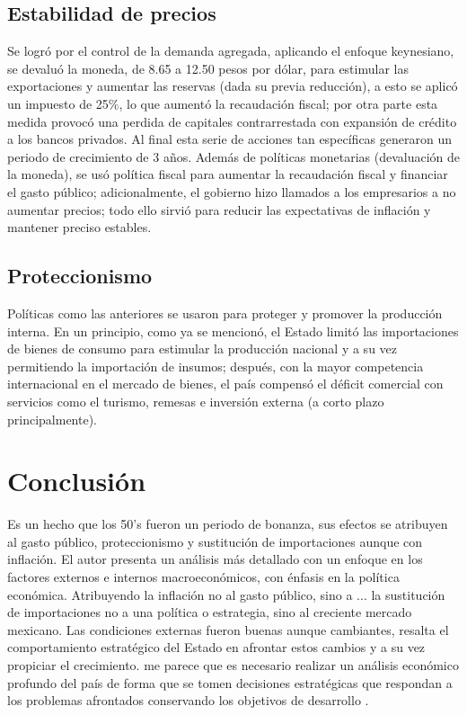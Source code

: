 \subsection{Estabilidad de precios}
Se logró por el control de la demanda agregada, aplicando el enfoque keynesiano, se devaluó la moneda, de 8.65 a 12.50 pesos por dólar, para estimular las exportaciones y aumentar las reservas (dada su previa reducción), a esto se aplicó un impuesto de 25\%, lo que aumentó la recaudación fiscal; por otra parte esta medida provocó una perdida de capitales contrarrestada con expansión de crédito a los bancos privados. Al final esta serie de acciones tan específicas generaron un periodo de crecimiento de 3 años.
Además de políticas monetarias (devaluación de la moneda), se usó política fiscal para aumentar la recaudación fiscal y financiar el gasto público; adicionalmente, el gobierno hizo llamados a los empresarios a no aumentar precios; todo ello sirvió para reducir las expectativas de inflación y mantener preciso estables.
\subsection{Proteccionismo}
Políticas como las anteriores se usaron para proteger y promover la producción interna. En un principio, como ya se mencionó, el Estado limitó las importaciones de bienes de consumo para estimular la producción nacional y a su vez permitiendo la importación de insumos; después, con la mayor competencia internacional en el mercado de bienes, el país compensó el déficit comercial con servicios como el turismo, remesas e inversión externa (a corto plazo principalmente).

\section{Conclusión}
Es un hecho que los 50's fueron un periodo de bonanza, sus efectos se atribuyen al gasto público, proteccionismo  y sustitución de importaciones aunque con inflación. El autor presenta un análisis más detallado con un enfoque en los factores externos e internos macroeconómicos, con énfasis en la política económica.
Atribuyendo la inflación no al gasto público, sino a ...
la sustitución de importaciones no a una política o estrategia, sino al creciente mercado mexicano.
Las condiciones externas fueron buenas aunque cambiantes, resalta el comportamiento estratégico del Estado en afrontar estos cambios y a su vez propiciar el crecimiento. me parece que es necesario realizar un análisis económico profundo del país de forma que se tomen decisiones estratégicas que respondan a los problemas afrontados conservando los objetivos de desarrollo \cite{CrecEcoSano}.